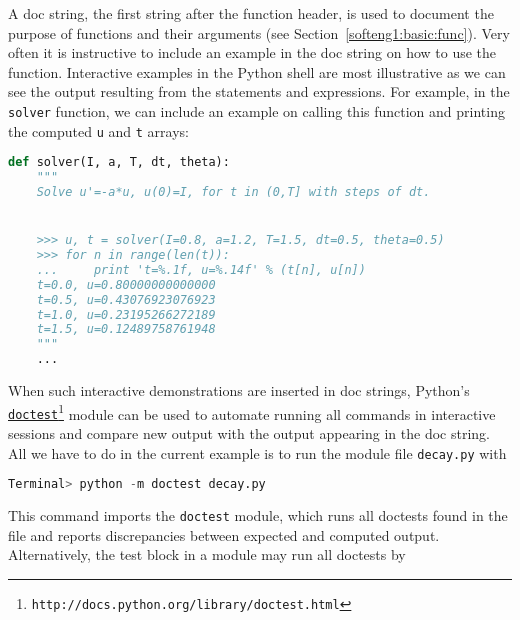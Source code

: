 \documentclass[graybox,sectrefs,envcountresetchap,open=right,final]{svmonodo}
\begin{document}
A doc string, the first string after the function header, is used to
document the purpose of functions and their arguments
(see Section~\ref{softeng1:basic:func}). Very often it
is instructive to include an example in the doc string
on how to use the function.
Interactive examples in the Python shell are most illustrative as
we can see the output resulting from the statements and expressions.
For example,
in the \texttt{solver} function, we can include an example on calling
this function and printing the computed \texttt{u} and \texttt{t} arrays:
















\begin{lstlisting}[language=python,style=blue1_bluegreen]
def solver(I, a, T, dt, theta):
    """
    Solve u'=-a*u, u(0)=I, for t in (0,T] with steps of dt.


    >>> u, t = solver(I=0.8, a=1.2, T=1.5, dt=0.5, theta=0.5)
    >>> for n in range(len(t)):
    ...     print 't=%.1f, u=%.14f' % (t[n], u[n])
    t=0.0, u=0.80000000000000
    t=0.5, u=0.43076923076923
    t=1.0, u=0.23195266272189
    t=1.5, u=0.12489758761948
    """
    ...

\end{lstlisting}


When such interactive demonstrations are inserted in doc strings,
Python's \href{{http://docs.python.org/library/doctest.html}}{\nolinkurl{doctest}\footnote{\texttt{http://docs.python.org/library/doctest.html}}}
module can be used to automate running all commands
in interactive sessions and compare new output with the output
appearing in the doc string.  All we have to do in the current example
is to run the module file \texttt{decay.py} with



\begin{lstlisting}[language=python,style=blue1_bluegreen]
Terminal> python -m doctest decay.py

\end{lstlisting}

This command imports the \texttt{doctest} module, which runs all
doctests found in the file and reports discrepancies between
expected and computed output.
Alternatively, the test block in a module may run all doctests
by
\end{document}
